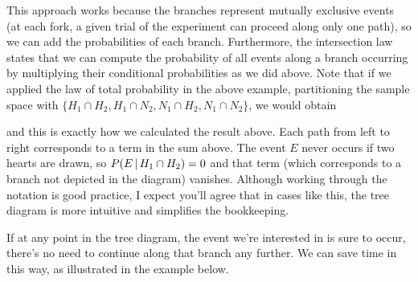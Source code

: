 \par
This approach works because the branches represent mutually exclusive events (at each fork, a given trial of the experiment can proceed along only one path), so we can add the probabilities of each branch. Furthermore, the intersection law states that we can compute the probability of all events along a branch occurring by multiplying their conditional probabilities as we did above. Note that if we applied the law of total probability in the above example, partitioning the sample space with $\{H_1 \cap H_2, H_1 \cap N_2, N_1 \cap H_2, N_1 \cap N_2\}$, we would obtain
\par
\noindent and this is exactly how we calculated the result above. Each path from left to right corresponds to a term in the sum above. The event $E$ never occurs if two hearts are drawn, so $P(E \,|\, H_1 \cap H_2) = 0$ and that term (which corresponds to a branch not depicted in the diagram) vanishes. Although working through the notation is good practice, I expect you'll agree that in cases like this, the tree diagram is more intuitive and simplifies the bookkeeping.
\par
If at any point in the tree diagram, the event we're interested in is sure to occur, there's no need to continue along that branch any further. We can save time in this way, as illustrated in the example below.
